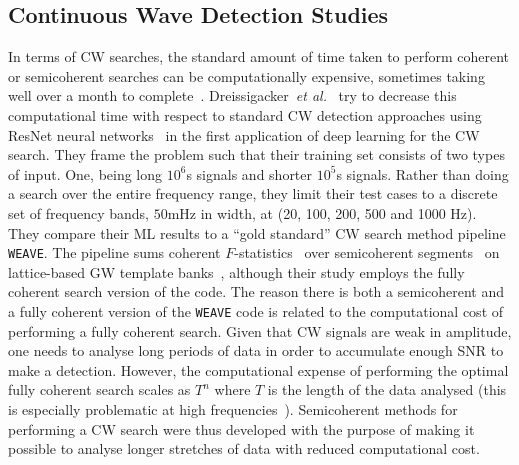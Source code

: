 %
%
\subsection{Continuous Wave Detection Studies}

%
In terms of \ac{CW} searches, the standard amount of time taken to 
perform coherent or semicoherent searches can be computationally 
expensive, sometimes taking well over a month to 
complete~\cite{PhysRevD.100.044009}. Dreissigacker~\textit{et
al.}~\cite{PhysRevD.100.044009} try to decrease 
this computational time with respect to standard \ac{CW} detection 
approaches using ResNet neural
networks~\cite{2015arXiv151203385H} in the first application of 
deep learning for the \ac{CW} search. They frame the problem 
such that their training set consists of two types of input. One, 
being long $10^6$s signals and shorter $10^5$s signals. Rather than 
doing a search over the entire frequency range, they limit their 
test cases to a discrete set of frequency bands, $50$mHz 
in width, at (20, 100, 200, 500 and 1000 Hz). They compare their 
\ac{ML} results to a ``gold standard'' \ac{CW} search method 
pipeline \texttt{WEAVE}. The pipeline sums 
coherent $F$-statistics~\cite{1998PhRvD..58f3001J} over 
semicoherent segments~\cite{PhysRevD.90.122010}
on lattice-based \ac{GW} template
banks~\cite{2007CQGra..24S.481P}, although their study 
employs the fully coherent search version of the 
code. The reason there is both a semicoherent and a fully coherent 
version of the \texttt{WEAVE} code is related to the computational 
cost of performing a fully coherent search. Given that \ac{CW} signals 
are weak in amplitude, one needs to analyse long periods of data 
in order to accumulate enough \ac{SNR} to make a detection. However, 
the computational expense of performing the optimal fully coherent search 
scales as $T^n$ where $T$ is the length of the data analysed 
(this 
is especially problematic at high 
frequencies~\cite{PhysRevD.90.122010}). Semicoherent 
methods for performing a \ac{CW} search were thus developed with the purpose 
of making it possible to analyse longer stretches of data with reduced 
computational cost.

